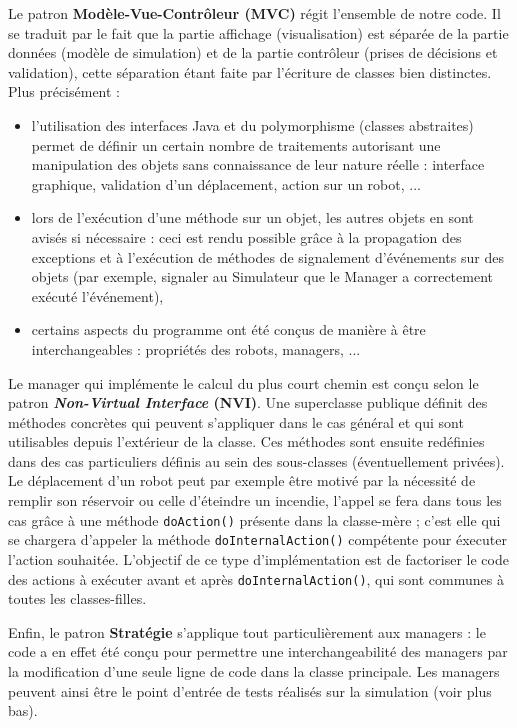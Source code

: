 \documentclass[a4paper,11pt]{article}
\begin{document}
\vspace{\baselineskip}
Le patron \textbf{Modèle-Vue-Contrôleur (MVC)} régit l'ensemble de notre code. Il se traduit par le fait que la partie affichage (visualisation) est séparée de la partie données (modèle de simulation) et de la partie contrôleur (prises de décisions et validation), cette séparation étant faite par l'écriture de classes bien distinctes. Plus précisément :
\begin{itemize}
    \item l'utilisation des interfaces Java et du polymorphisme (classes abstraites) permet de définir un certain nombre de traitements autorisant une manipulation des objets sans connaissance de leur nature réelle : interface graphique, validation d'un déplacement, action sur un robot, ...
    \item lors de l'exécution d'une méthode sur un objet, les autres objets en sont avisés si nécessaire : ceci est rendu possible grâce à la propagation des exceptions et à l'exécution de méthodes de signalement d'événements sur des objets (par exemple, signaler au Simulateur que le Manager a correctement exécuté l'événement),
    \item certains aspects du programme ont été conçus de manière à être interchangeables : propriétés des robots, managers, ...
\end{itemize}

\vspace{\baselineskip}
Le manager qui implémente le calcul du plus court chemin est conçu selon le patron \textbf{\emph{Non-Virtual Interface} (NVI)}. Une superclasse publique définit des méthodes concrètes qui peuvent s'appliquer dans le cas général et qui sont utilisables depuis l'extérieur de la classe. Ces méthodes sont ensuite redéfinies dans des cas particuliers définis au sein des sous-classes (éventuellement privées). Le déplacement d'un robot peut par exemple être motivé par la nécessité de remplir son réservoir ou celle d'éteindre un incendie, l'appel se fera dans tous les cas grâce à une méthode \texttt{doAction()} présente dans la classe-mère ; c'est elle qui se chargera d'appeler la méthode \texttt{doInternalAction()} compétente pour éxecuter l'action souhaitée. L'objectif de ce type d'implémentation est de factoriser le code des actions à exécuter avant et après \texttt{doInternalAction()}, qui sont communes à toutes les classes-filles.

\vspace{\baselineskip}
Enfin, le patron \textbf{Stratégie} s'applique tout particulièrement aux managers : le code a en effet été conçu pour permettre une interchangeabilité des managers par la modification d'une seule ligne de code dans la classe principale. Les managers peuvent ainsi être le point d'entrée de tests réalisés sur la simulation (voir plus bas).
\end{document}
